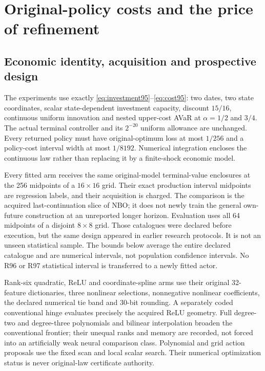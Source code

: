 \section{Original-policy costs and the price of refinement}\label{sec:study110}
\subsection{Economic identity, acquisition and prospective design}
The experiments use exactly \eqref{eq:investment95}--\eqref{eq:cost95}: two dates, two state coordinates, scalar state-dependent investment capacity, discount $15/16$, continuous uniform innovation and nested upper-cost AVaR at $\alpha=1/2$ and $3/4$. The actual terminal controller and its $2^{-20}$ uniform allowance are unchanged. Every returned policy must have original-optimum loss at most $1/256$ and a policy-cost interval width at most $1/8192$. Numerical integration encloses the continuous law rather than replacing it by a finite-shock economic model.

Every fitted arm receives the same original-model terminal-value enclosures at the 256 midpoints of a $16\times16$ grid. Their exact production interval midpoints are regression labels, and their acquisition is charged. The comparison is the acquired last-continuation slice of NBO; it does not newly train the general own-future construction at an unreported longer horizon. Evaluation uses all 64 midpoints of a disjoint $8\times8$ grid. Those catalogues were declared before execution, but the same design appeared in earlier research protocols. It is not an unseen statistical sample. The bounds below average the entire declared catalogue and are numerical intervals, not population confidence intervals. No R96 or R97 statistical interval is transferred to a newly fitted actor.

Rank-six quadratic, ReLU and coordinate-spline arms use their original 32-feature dictionaries, three nonlinear selections, nonnegative nonlinear coefficients, the declared numerical tie band and 30-bit rounding. A separately coded conventional hinge evaluates precisely the acquired ReLU geometry. Full degree-two and degree-three polynomials and bilinear interpolation broaden the conventional frontier; their unequal ranks and memory are recorded, not forced into an artificially weak neural comparison class. Polynomial and grid action proposals use the fixed scan and local scalar search. Their numerical optimization status is never original-law certificate authority.

